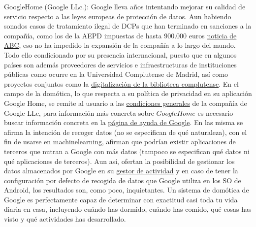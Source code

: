 \vspace{1cm}

GoogleHome (Google LLc.): Google lleva años intentando mejorar su calidad de servicio respecto a las leyes europeas de protección de datos. Aun habiendo sonados casos de tratamiento ilegal de DCPs que han terminado en sanciones a la compañía, como los de la AEPD impuestas de hasta 900.000 euros \href{https://www.abc.es/tecnologia/redes/20131219/abci-google-multa-aepd-201312191217.html}{noticia de ABC}, eso no ha impedido la expansión de la compañía a lo largo del mundo. Todo ello condicionado por su presencia internacional, puesto que en algunos países son además proveedores de servicios e infraestructuras de instituciones públicas como ocurre en la Universidad Complutense de Madrid, así como proyectos conjuntos como la \href{https://biblioteca.ucm.es/google8}{digitalización de la biblioteca complutense}. En el campo de la domótica, lo que respecta a su política de privacidad en su aplicación Google Home, se remite al usuario a las \href{https://policies.google.com/privacy?hl=es}{condiciones generales} de la compañía de Google LLc, para información más concreta sobre $Google Home$ es necesario buscar información concreta en la \href{https://support.google.com/googlehome/answer/7072285?hl=es&ref_topic=7173611}{página de ayuda de Google}. En las misma se afirma la intención de recoger datos (no se especifican de qué naturaleza), con el fin de usarse en \gls{machinelearning}, afirman que podrían existir aplicaciones de terceros que nutran a Google con más datos (tampoco se especifican qué datos ni qué aplicaciones de terceros). Aun así, ofertan la posibilidad de gestionar los datos almacenados por Google en su \href{https://myactivity.google.com/}{gestor de actividad} y en caso de tener la configuración por defecto de recogida de datos que Google utiliza en los SO de Android, los resultados son, como poco, inquietantes. Un sistema de domótica de Google es perfectamente capaz de determinar con exactitud casi toda tu vida diaria en casa, incluyendo cuándo has dormido, cuándo has comido, qué cosas has visto y qué actividades has desarrollado.

\vspace{1cm}

